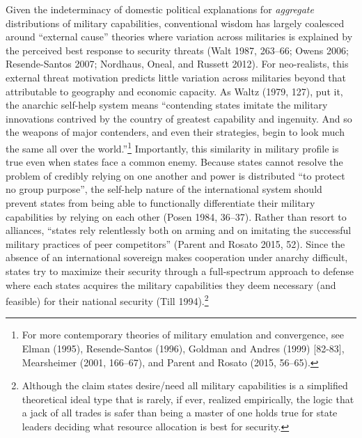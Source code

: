 \documentclass[
  12,
  letterpaper,
  DIV=11,
  numbers=noendperiod]{scrartcl}
\begin{document}
Given the indeterminacy of domestic political explanations for
\emph{aggregate} distributions of military capabilities, conventional
wisdom has largely coalesced around ``external cause'' theories where
variation across militaries is explained by the perceived best response
to security threats (Walt 1987, 263--66; Owens 2006; Resende-Santos
2007; Nordhaus, Oneal, and Russett 2012). For neo-realists, this
external threat motivation predicts little variation across militaries
beyond that attributable to geography and economic capacity. As Waltz
(1979, 127), put it, the anarchic self-help system means ``contending
states imitate the military innovations contrived by the country of
greatest capability and ingenuity. And so the weapons of major
contenders, and even their strategies, begin to look much the same all
over the world.''\footnote{For more contemporary theories of military
  emulation and convergence, see Elman (1995), Resende-Santos (1996),
  Goldman and Andres (1999) {[}82-83{]}, Mearsheimer (2001, 166--67),
  and Parent and Rosato (2015, 56--65).} Importantly, this similarity in
military profile is true even when states face a common enemy. Because
states cannot resolve the problem of credibly relying on one another and
power is distributed ``to protect no group purpose'', the self-help
nature of the international system should prevent states from being able
to functionally differentiate their military capabilities by relying on
each other (Posen 1984, 36--37). Rather than resort to alliances,
``states rely relentlessly both on arming and on imitating the
successful military practices of peer competitors'' (Parent and Rosato
2015, 52). Since the absence of an international sovereign makes
cooperation under anarchy difficult, states try to maximize their
security through a full-spectrum approach to defense where each states
acquires the military capabilities they deem necessary (and feasible)
for their national security (Till 1994).\footnote{Although the claim
  states desire/need all military capabilities is a simplified
  theoretical ideal type that is rarely, if ever, realized empirically,
  the logic that a jack of all trades is safer than being a master of
  one holds true for state leaders deciding what resource allocation is
  best for security.}
\end{document}
